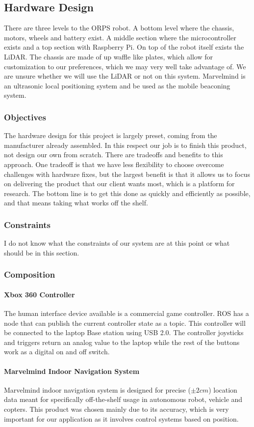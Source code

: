 \documentclass[english,12pt]{article}
\begin{document}
\subsection{Hardware Design}
There are three levels to the ORPS robot. A bottom level where the chassis, motors, wheels and battery
exist. A middle section where the microcontroller exists and a top section with Raspberry Pi. On top of the robot
itself exists the LiDAR. The chassis are made of up waffle like plates, which allow for customization to
our preferences, which we may very well take advantage of. We are unsure whether we will use the
LiDAR or not on this system. Marvelmind is an ultrasonic local positioning system and be used as 
the mobile beaconing system.
\subsubsection{Objectives}
The hardware design for this project is largely preset, coming from the manufacturer already assembled.
In this respect our job is to finish this product, not design our own from scratch. There are tradeoffs and
benefits to this approach. One tradeoff is that we have less flexibility to choose overcome challenges
with hardware fixes, but the largest benefit is that it allows us to focus on delivering the product that
our client wants most, which is a platform for research. The bottom line is to get this done as quickly and
efficiently as possible, and that means taking what works off the shelf.
\subsubsection{Constraints}
I do not know what the constraints of our system are at this point or what should be in this
section.
\subsubsection{Composition}
\paragraph{Xbox 360 Controller}
The human interface device available is a commercial game controller. ROS has a node that can publish
the current controller state as a topic. This controller will be connected to the laptop Base station using
USB 2.0. The controller joysticks and triggers return an analog value to the laptop while the rest of the
buttons work as a digital on and off switch.
\paragraph{Marvelmind Indoor Navigation System}
Marvelmind indoor navigation system is designed for precise ($\pm 2 cm$) location data meant for
specifically off-the-shelf usage in autonomous robot, vehicle and copters. This product was chosen
mainly due to its accuracy, which is very important for our application as it involves control systems
based on position.
\end{document}
